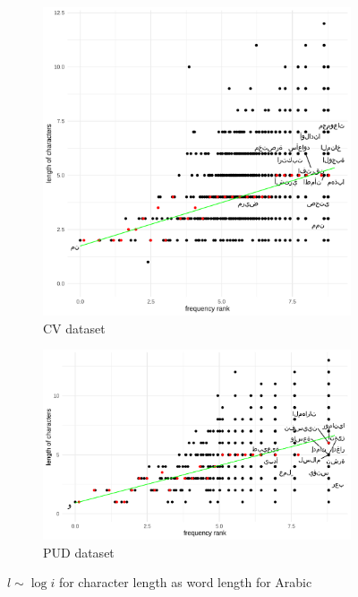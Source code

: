 \begin{figure}[H]
  \centering
  \begin{subfigure}[b]{0.48\textwidth}
    \centering
    \includegraphics[width=\textwidth]{plots/Arabic_logi_cl_CV.pdf}
    \caption{CV dataset}
  \end{subfigure}
  \hfill
  \begin{subfigure}[b]{0.48\textwidth}
    \centering
    \includegraphics[width=\textwidth]{plots/Arabic_logi_cl_PUD.pdf}
    \caption{PUD dataset}
  \end{subfigure}
  \caption{$l \sim \log i$ for character length as word length for Arabic}
\end{figure}
